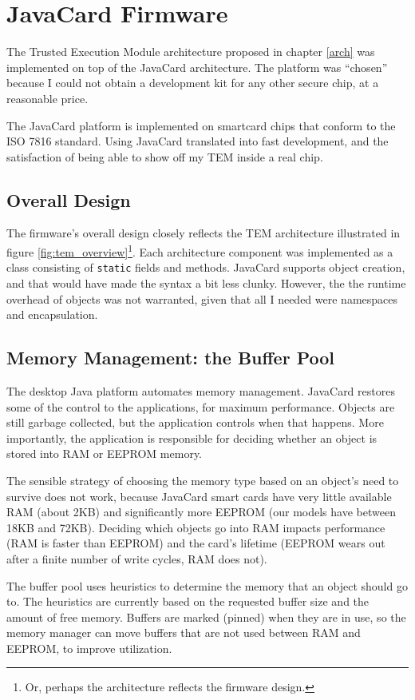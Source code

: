 \section{JavaCard Firmware}\label{impl:firmware}
The Trusted Execution Module architecture proposed in chapter \ref{arch} was
implemented on top of the JavaCard architecture. The platform was ``chosen''
because I could not obtain a development kit for any other secure
chip, at a reasonable price.

The JavaCard platform is implemented on smartcard chips that conform to the
ISO 7816 standard. Using JavaCard translated into fast development, and the
satisfaction of being able to show off my TEM inside a real chip.

\subsection{Overall Design}
The firmware's overall design closely reflects the TEM architecture illustrated
in figure \ref{fig:tem_overview}\footnote{Or, perhaps the  architecture reflects
the firmware design.}. Each architecture component was implemented as a class
consisting of \texttt{static} fields and methods. JavaCard supports object
creation, and that would have made the syntax a bit less clunky. However, the
the runtime overhead of objects was not warranted, given that all I needed were
namespaces and encapsulation.

\subsection{Memory Management: the Buffer Pool}
The desktop Java platform automates memory management. JavaCard restores some
of the control to the applications, for maximum performance. Objects are still
garbage collected, but the application controls when that happens. More
importantly, the application is responsible for deciding whether an object is
stored into RAM or EEPROM memory.

The sensible strategy of choosing the memory type based on an object's need to
survive does not work, because JavaCard smart cards have very little
available RAM (about 2KB) and significantly more EEPROM (our models have between
18KB and 72KB). Deciding which objects go into RAM impacts performance (RAM is
faster than EEPROM) and the card's lifetime (EEPROM wears out after a finite
number of write cycles, RAM does not).

The buffer pool uses heuristics to determine the memory that an object should go
to. The heuristics are currently based on the requested buffer size and the
amount of free memory. Buffers are marked (pinned) when they are in use, so the
memory manager can move buffers that are not used between RAM and EEPROM, to
improve utilization.

